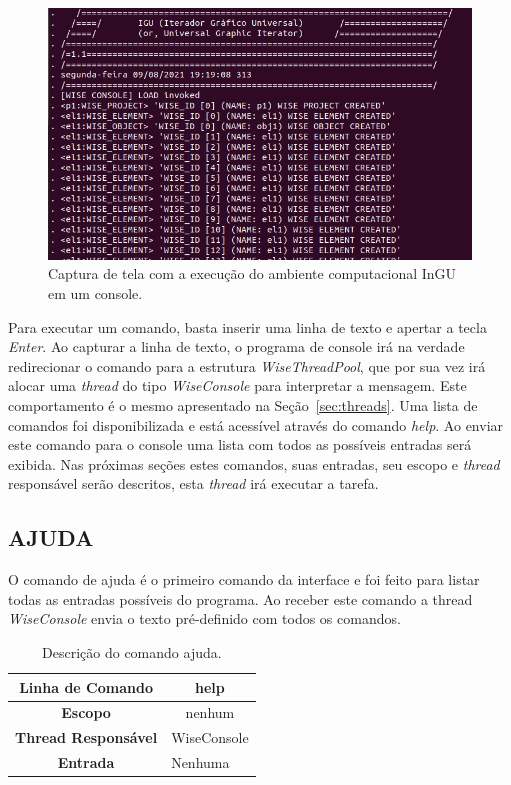 \begin{figure}[!htbp]
	\centering
	\includegraphics[scale=0.45]{Figures/InGU_console.png}
	\caption{Captura de tela com a execução do ambiente computacional InGU em um console.}
	\label{fig11:ajuda}
\end{figure}

Para executar um comando, basta inserir uma linha de texto e apertar a tecla \textit{Enter}.  Ao capturar a linha de texto, o programa de console irá na verdade redirecionar o comando para a estrutura \textit{WiseThreadPool}, que por sua vez irá alocar uma \textit{thread} do tipo \textit{WiseConsole} para interpretar a mensagem. Este comportamento é o mesmo apresentado na Seção~\ref{sec:threads}. Uma lista de comandos foi disponibilizada e está acessível através do comando \textit{help}. Ao enviar este comando para o console uma lista com todos as possíveis entradas será exibida. Nas próximas seções estes comandos, suas entradas, seu escopo e \textit{thread} responsável serão descritos, esta \textit{thread} irá executar a tarefa. 

\subsection{AJUDA}\label{sec:help}

O comando de ajuda é o primeiro comando da interface e foi feito para listar todas as entradas possíveis do programa. Ao receber este comando a thread \textit{WiseConsole} envia o texto pré-definido com todos os comandos.

\begin{center}
	\begin{table}[!htbp]
		\begin{tabularx}{\textwidth}{c|X}
			\toprule
			\textbf{Linha de Comando} & \multicolumn{1}{c}{help} \\
			\midrule
			\textbf{Escopo} & \multicolumn{1}{c}{nenhum} \\
			\hline
			\textbf{Thread Responsável} & \multicolumn{1}{c}{WiseConsole} \\
			\hline
			\textbf{Entrada} & Nenhuma \\
			\bottomrule
		\end{tabularx}
		\caption{Descrição do comando ajuda.}
		\label{tab:help}
	\end{table}
\end{center}

